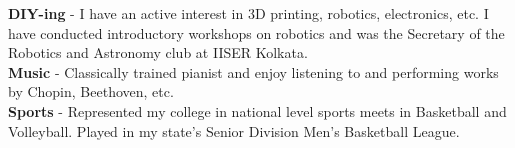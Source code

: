 \documentclass[10pt,a4paper]{article}
\begin{document}
\spacedhrule{1.6em}{-0.4em}
	  \textbf{DIY-ing} - I have an active interest in 3D printing, robotics, electronics, etc. I have conducted introductory workshops on robotics and was the Secretary of the Robotics and Astronomy club at IISER Kolkata.\\
	  \textbf{Music} - Classically trained pianist and enjoy listening to and performing works by Chopin, Beethoven, etc.\\
	  \textbf{Sports} - Represented my college in national level sports meets in Basketball and Volleyball. Played in my state's Senior Division Men's Basketball League.\\

\spacedhrule{1.6em}{-0.4em}
\end{document}
